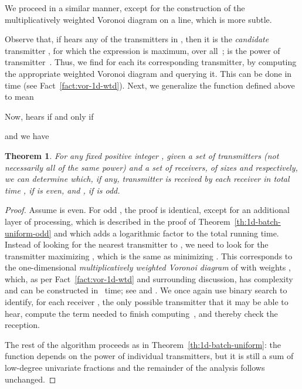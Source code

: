 \documentclass[11pt]{article}
\newtheorem{theorem}{Theorem}[section]
\theoremstyle{remark}
\begin{document}
We proceed in a similar manner, except for the construction of the multiplicatively weighted Voronoi diagram on a line, which is more subtle.

Observe that, if  hears any of the transmitters in , then it is the \emph{candidate} transmitter , for which the expression  is maximum, over all~;  is the power of transmitter~. 
Thus, we find for each  its corresponding transmitter, by
computing the appropriate weighted Voronoi diagram and querying it. This can be done in  time (see Fact~\ref{fact:vor-1d-wtd}).  
Next, we generalize the function  defined above to mean

Now,  hears  if and only if 

and we have

\begin{theorem}
  \label{th:1d-batch-nonuniform}
  For any fixed positive integer , given a set  of
  transmitters (not necessarily all of the same power) and a set 
  of receivers, of sizes  and  respectively, we can determine
  which, if any, transmitter is received by each receiver in total
  time , if  is even, and , if  is odd.
\end{theorem}

\begin{proof}
  Assume  is even. For odd , the proof is identical, except for an additional layer of processing, which is described in the proof of Theorem~\ref{th:1d-batch-uniform-odd} and which adds a logarithmic factor to the total running time. 
  Instead of looking for the nearest transmitter to , we need to
  look for the transmitter maximizing , which is
  the same as minimizing .  This corresponds to the
  one-dimensional \emph{multiplicatively weighted Voronoi diagram} of
   with weights , which, as per Fact~\ref{fact:vor-1d-wtd} and surrounding discussion, has complexity  and can be constructed 
  in~ time; see \cite{a-odwvd-86} and
  \cite[Theorem~6.1]{sa-dsstg-95}.  We once again use binary search to
  identify, for each receiver , the only possible transmitter
   that it may be able to hear, compute the term
   needed to finish computing~, and thereby
  check the reception.

  The rest of the algorithm proceeds as in
  Theorem~\ref{th:1d-batch-uniform}: the function  depends on the
  power of individual transmitters, but it is still a sum of 
  low-degree univariate fractions and the remainder of the analysis follows unchanged.
\end{proof}
\end{document}
